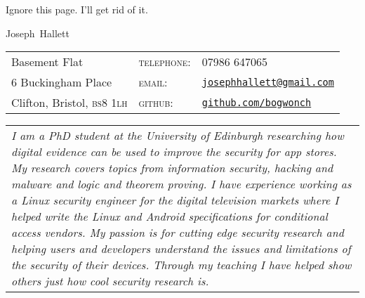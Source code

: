 \documentclass[10pt,selectp]{book}
\newcommand{\lowercaps}[1]{\textsc{\MakeLowercase{#1}}}
\newcommand{\heading}[1]{{{\color{BrickRed}\hspace{1em}\Huge #1}\vspace{0.5em}}}
\newcommand{\email}[1]{\href{mailto:#1}{#1}}
\newcommand{\postcode}[1]{\lowercaps{#1}}
\begin{document}
Ignore this page.  I'll get rid of it.
\newpage

\heading{Joseph~Hallett}

\begin{tabular}{l@{\hspace{12em}} l@{\hspace{1em}} l}
Basement Flat & \textsc{telephone:} & 07986 647065 \\
6 Buckingham Place & \textsc{email:} & \email{\tt josephhallett@gmail.com} \\
Clifton, Bristol, \postcode{bs8 1lh} & \textsc{github:} & \href{https://www.github.com/bogwonch}{\tt github.com/bogwonch} \\
\end{tabular}

\vspace{1em}
\begin{tabular}{p{\textwidth}}\itshape
  I am a PhD student at the University of Edinburgh researching how digital
  evidence can be used to improve the security for app stores.  My research
  covers topics from information security, hacking and malware and logic and
  theorem proving.  I have experience working as a Linux security engineer for
  the digital television markets where I helped write the Linux and Android
  specifications for conditional access vendors.  My passion is for cutting
  edge security research and helping users and developers understand the issues
  and limitations of the security of their devices. Through my teaching I have
  helped show others just how cool security research is.
\end{tabular}
\vspace{0.3em}
\end{document}
